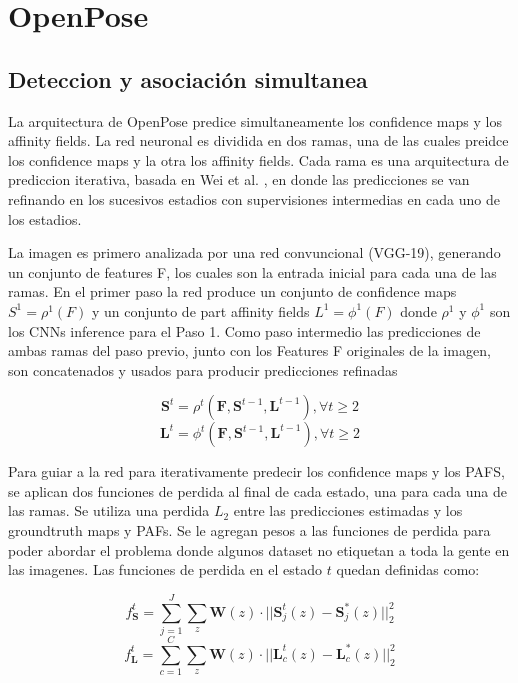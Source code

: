 \documentclass[runningheads]{llncs}
\begin{document}
\section{OpenPose}

\subsection{Deteccion y asociación simultanea}
La arquitectura de OpenPose predice simultaneamente los confidence maps y los affinity fields. La red neuronal es dividida en dos ramas, una de las cuales preidce los confidence maps y la otra los affinity fields. Cada rama es una arquitectura de prediccion iterativa, basada en Wei et al. , en donde las predicciones se van refinando en los sucesivos estadios con supervisiones intermedias en cada uno de los estadios.

La imagen es primero analizada por una red convuncional (VGG-19), generando un conjunto de features F, los cuales son la entrada inicial para cada una de las ramas. En el primer paso la red produce un conjunto de confidence maps $ S^{1} = \rho^{1}(F) $ y un conjunto de part affinity fields $ L^{1} = \phi^{1}(F) $ donde $ \rho^{1} $ y $ \phi^{1} $ son los CNNs inference para el Paso 1. Como paso intermedio las predicciones de ambas ramas del paso previo, junto con los Features F originales de la imagen, son concatenados y usados para producir predicciones refinadas

\begin{equation}
\textbf{S}^t = \rho^t(\textbf{F},\textbf{S}^{t-1},\textbf{L}^{t-1}), \forall t \geq 2
\end{equation}
\begin{equation}
\textbf{L}^t = \phi^t(\textbf{F},\textbf{S}^{t-1},\textbf{L}^{t-1}), \forall t \geq 2
\end{equation}

Para guiar a la red para iterativamente predecir los confidence maps y los PAFS, se aplican dos funciones de perdida al final de cada estado, una para cada una de las ramas. Se utiliza una perdida $L_{2}$ entre las predicciones estimadas y los groundtruth maps y PAFs. Se le agregan pesos a las funciones de perdida para poder abordar el problema donde algunos dataset no etiquetan a toda la gente en las imagenes. Las funciones de perdida en el estado $t$ quedan definidas como:

\begin{equation}
f_{\textbf{S}}^t = \sum_{j=1}^{J} \sum_{z} \textbf{W}(z) \cdot || \textbf{S}_{j}^t(z) - \textbf{S}_{j}^*(z)||_2^2
\end{equation}
\begin{equation}
f_{\textbf{L}}^t = \sum_{c=1}^{C} \sum_{z} \textbf{W}(z) \cdot || \textbf{L}_{c}^t(z) - \textbf{L}_{c}^*(z)||_2^2
\end{equation}
\end{document}
